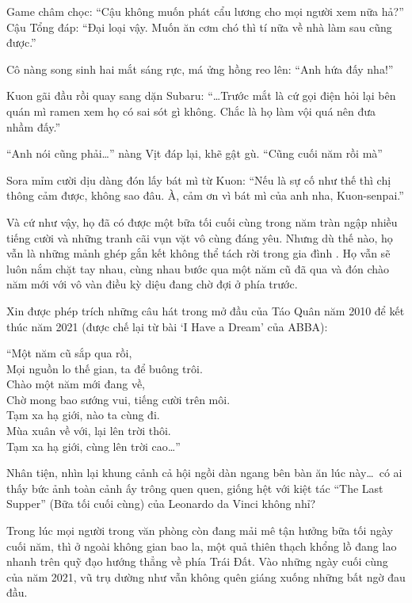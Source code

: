 \documentclass[../main.tex]{subfiles}
\begin{document}
Game châm chọc: ``Cậu không muốn phát cẩu lương cho mọi người xem nữa hả?'' Cậu Tổng đáp: ``Đại loại vậy. Muốn ăn cơm chó thì tí nữa về nhà làm sau cũng được.''

Cô nàng song sinh hai mắt sáng rực, má ửng hồng reo lên: ``Anh hứa đấy nha!''

Kuon gãi đầu rồi quay sang dặn Subaru: ``\dots Trước mắt là cứ gọi điện hỏi lại bên quán mì ramen xem họ có sai sót gì không. Chắc là họ làm vội quá nên đưa nhầm đấy.''

``Anh nói cũng phải\dots'' nàng Vịt đáp lại, khẽ gật gù. ``Cũng cuối năm rồi mà''

Sora mỉm cười dịu dàng đón lấy bát mì từ Kuon: ``Nếu là sự cố như thế thì chị thông cảm được, không sao đâu. À, cảm ơn vì bát mì của anh nha, Kuon-senpai.''

Và cứ như vậy, họ đã có được một bữa tối cuối cùng trong năm tràn ngập nhiều tiếng cười và những tranh cãi vụn vặt vô cùng đáng yêu. Nhưng dù thế nào, họ vẫn là những mảnh ghép gắn kết không thể tách rời trong gia đình \hll. Họ vẫn sẽ luôn nắm chặt tay nhau, cùng nhau bước qua một năm cũ đã qua và đón chào năm mới với vô vàn điều kỳ diệu đang chờ đợi ở phía trước.

Xin được phép trích những câu hát trong mở đầu của Táo Quân năm 2010 để kết thúc năm 2021 (được chế lại từ bài `I Have a Dream' của ABBA):

\tabs[4cm] ``Một năm cũ sắp qua rồi, \\
\tabs[4cm] Mọi nguồn lo thế gian, ta để buông trôi.\\
\tabs[4cm] Chào một năm mới đang về,\\
\tabs[4cm] Chờ mong bao sướng vui, tiếng cười trên môi.\\
\tabs[4cm] Tạm xa hạ giới, nào ta cùng đi.\\
\tabs[4cm] Mùa xuân về với, lại lên trời thôi.\\
\tabs[4cm] Tạm xa hạ giới, cùng lên trời cao\dots''

Nhân tiện, nhìn lại khung cảnh cả hội ngồi dàn ngang bên bàn ăn lúc này\dots\ có ai thấy bức ảnh toàn cảnh ấy trông quen quen, giống hệt với kiệt tác ``The Last Supper'' (Bữa tối cuối cùng) của Leonardo da Vinci không nhỉ?


\omk

Trong lúc mọi người trong văn phòng còn đang mải mê tận hưởng bữa tối ngày cuối năm, thì ở ngoài không gian bao la, một quả thiên thạch khổng lồ đang lao nhanh trên quỹ đạo hướng thẳng về phía Trái Đất. Vào những ngày cuối cùng của năm 2021, vũ trụ dường như vẫn không quên giáng xuống những bất ngờ đau đầu.
\end{document}
